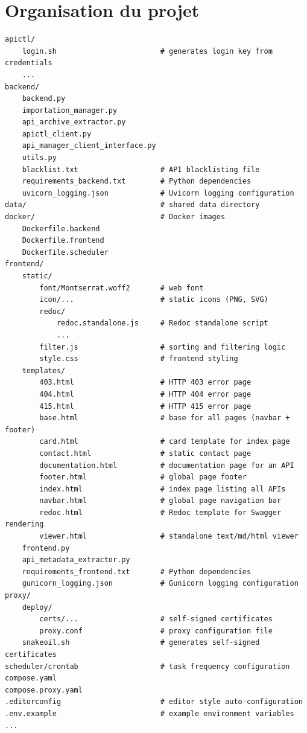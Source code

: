 \section{Organisation du projet}
\begin{lstlisting}[caption={Structure du projet}, frame=single]
apictl/
    login.sh                        # generates login key from credentials
    ...
backend/
    backend.py
    importation_manager.py
    api_archive_extractor.py
    apictl_client.py
    api_manager_client_interface.py
    utils.py
    blacklist.txt                   # API blacklisting file
    requirements_backend.txt        # Python dependencies
    uvicorn_logging.json            # Uvicorn logging configuration
data/                               # shared data directory
docker/                             # Docker images
    Dockerfile.backend
    Dockerfile.frontend
    Dockerfile.scheduler
frontend/
    static/
        font/Montserrat.woff2       # web font
        icon/...                    # static icons (PNG, SVG)
        redoc/
            redoc.standalone.js     # Redoc standalone script
            ...
        filter.js                   # sorting and filtering logic
        style.css                   # frontend styling
    templates/
        403.html                    # HTTP 403 error page
        404.html                    # HTTP 404 error page
        415.html                    # HTTP 415 error page
        base.html                   # base for all pages (navbar + footer)
        card.html                   # card template for index page
        contact.html                # static contact page
        documentation.html          # documentation page for an API
        footer.html                 # global page footer
        index.html                  # index page listing all APIs
        navbar.html                 # global page navigation bar
        redoc.html                  # Redoc template for Swagger rendering
        viewer.html                 # standalone text/md/html viewer
    frontend.py
    api_metadata_extractor.py
    requirements_frontend.txt       # Python dependencies
    gunicorn_logging.json           # Gunicorn logging configuration
proxy/
    deploy/
        certs/...                   # self-signed certificates
        proxy.conf                  # proxy configuration file
    snakeoil.sh                     # generates self-signed certificates
scheduler/crontab                   # task frequency configuration
compose.yaml
compose.proxy.yaml
.editorconfig                       # editor style auto-configuration
.env.example                        # example environment variables
...
\end{lstlisting}

